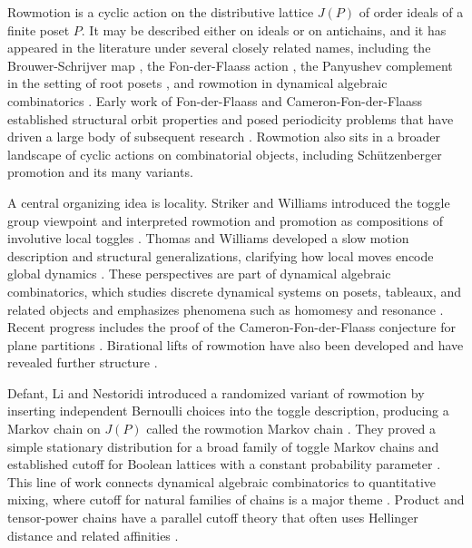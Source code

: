 \documentclass[final,3p,times]{elsarticle}
\theoremstyle{definition}
\begin{document}
Rowmotion is a cyclic action on the distributive lattice $J(P)$ of order ideals of a finite poset $P$.
It may be described either on ideals or on antichains, and it has appeared in the literature under several closely related names, including the Brouwer-Schrijver map \cite{BrouwerSchrijver1974}, the Fon-der-Flaass action \cite{FonDerFlaass1993}, the Panyushev complement in the setting of root posets \cite{Panyushev2009}, and rowmotion in dynamical algebraic combinatorics \cite{Striker2017Dynamical}.
Early work of Fon-der-Flaass and Cameron-Fon-der-Flaass established structural orbit properties and posed periodicity problems that have driven a large body of subsequent research \cite{FonDerFlaass1993,CameronFonDerFlaass1995}.
Rowmotion also sits in a broader landscape of cyclic actions on combinatorial objects, including Sch\"utzenberger promotion \cite{Schutzenberger1972Promotion} and its many variants.

A central organizing idea is locality.
Striker and Williams introduced the toggle group viewpoint and interpreted rowmotion and promotion as compositions of involutive local toggles \cite{StrikerWilliams2012}.
Thomas and Williams developed a slow motion description and structural generalizations, clarifying how local moves encode global dynamics \cite{ThomasWilliams2019Slow}.
These perspectives are part of dynamical algebraic combinatorics, which studies discrete dynamical systems on posets, tableaux, and related objects and emphasizes phenomena such as homomesy and resonance \cite{ProppRoby2015Homomesy,Striker2017Dynamical}.
Recent progress includes the proof of the Cameron-Fon-der-Flaass conjecture for plane partitions \cite{PatriasPechenik2020Dynamics}.
Birational lifts of rowmotion have also been developed and have revealed further structure \cite{MusikerRoby2019BirationalPaths}.

Defant, Li and Nestoridi introduced a randomized variant of rowmotion by inserting independent Bernoulli choices into the toggle description, producing a Markov chain on $J(P)$ called the rowmotion Markov chain \cite{DefantLiNestoridi2024Rowmotion}.
They proved a simple stationary distribution for a broad family of toggle Markov chains and established cutoff for Boolean lattices with a constant probability parameter \cite{DefantLiNestoridi2024Rowmotion}.
This line of work connects dynamical algebraic combinatorics to quantitative mixing, where cutoff for natural families of chains is a major theme \cite{Diaconis1996Cutoff}.
Product and tensor-power chains have a parallel cutoff theory that often uses Hellinger distance and related affinities \cite{ChenKumagai2018ProductCutoff}.
\end{document}
